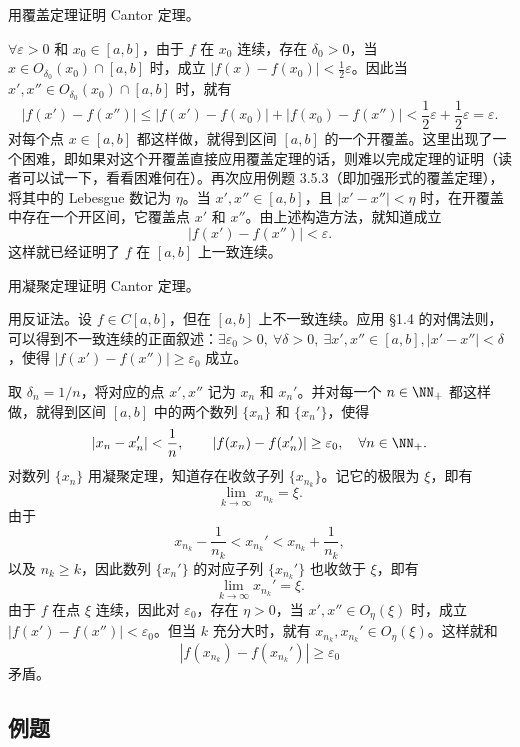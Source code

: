 \begin{xexample}[5.4.1]
用覆盖定理证明 Cantor 定理。
\end{xexample}
\begin{xproof}
$\forall\varepsilon>0$ 和 $x_0\in[a,b]$，由于 $f$ 在 $x_0$ 连续，存在 $\delta_0>0$，当 $x\in O_{\delta_0}(x_0)\cap[a,b]$ 时，成立 $|f(x)-f(x_0)|<\frac12\varepsilon$。因此当 $x',x''\in O_{\delta_0}(x_0)\cap[a,b]$ 时，就有
\[
  |f(x')-f(x'')|\le|f(x')-f(x_0)|+|f(x_0)-f(x'')|<\frac12\varepsilon+\frac12\varepsilon=\varepsilon.
\]
对每个点 $x\in[a,b]$ 都这样做，就得到区间 $[a,b]$ 的一个开覆盖。这里出现了一个困难，即如果对这个开覆盖直接应用覆盖定理的话，则难以完成定理的证明（读者可以试一下，看看困难何在）。再次应用例题 3.5.3（即加强形式的覆盖定理），将其中的 Lebesgue 数记为 $\eta$。当 $x',x''\in[a,b]$，且 $|x'-x''|<\eta$ 时，在开覆盖中存在一个开区间，它覆盖点 $x'$ 和 $x''$。由上述构造方法，就知道成立
\[
  |f(x')-f(x'')|<\varepsilon.
\]
这样就已经证明了 $f$ 在 $[a,b]$ 上一致连续。
\end{xproof}

\begin{xexample}[5.4.2]
用凝聚定理证明 Cantor 定理。
\end{xexample}
\begin{xproof}
用反证法。设 $f\in C[a,b]$，但在 $[a,b]$ 上不一致连续。应用 §1.4 的对偶法则，可以得到不一致连续的正面叙述：$\exists\varepsilon_0>0,\ \forall\delta>0,\ \exists x',x''\in[a,b],|x'-x''|<\delta$，使得 $|f(x')-f(x'')|\ge\varepsilon_0$ 成立。

取 $\delta_n=1/n$，将对应的点 $x',x''$ 记为 $x_n$ 和 $x_n'$。并对每一个 $n\in\NN_+$ 都这样做，就得到区间 $[a,b]$ 中的两个数列 $\{x_n\}$ 和 $\{x_n'\}$，使得
\[
  |x_n-x_n'|<\frac1n,\qquad |f(x_n)-f(x_n')|\ge\varepsilon_0,\quad \forall n\in\NN_+.
\]
对数列 $\{x_n\}$ 用凝聚定理，知道存在收敛子列 $\{x_{n_k}\}$。记它的极限为 $\xi$，即有
\[
  \lim_{k\to\infty}x_{n_k}=\xi.
\]
由于
\[
  x_{n_k}-\frac1{n_k}<x_{n_k}'<x_{n_k}+\frac1{n_k},
\]
以及 $n_k\ge k$，因此数列 $\{x_n'\}$ 的对应子列 $\{x_{n_k}'\}$ 也收敛于 $\xi$，即有
\[
  \lim_{k\to\infty}x_{n_k}'=\xi.
\]
由于 $f$ 在点 $\xi$ 连续，因此对 $\varepsilon_0$，存在 $\eta>0$，当 $x',x''\in O_\eta(\xi)$ 时，成立 $|f(x')-f(x'')|<\varepsilon_0$。但当 $k$ 充分大时，就有 $x_{n_k},x_{n_k}'\in O_\eta(\xi)$。这样就和
\[
  |f(x_{n_k})-f(x_{n_k}')|\ge\varepsilon_0
\]
矛盾。
\end{xproof}

\subsection{例题}

